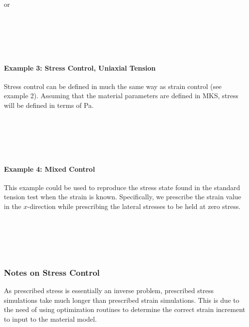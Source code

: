 \documentclass[11pt]{article}
\newcommand{\levelo}{\indent\hspace{.2in}}
\newcommand{\levelt}{\indent\hspace{.4in}}
\begin{document}
\noindent or

\indent\hspace{0.2in}\\
\indent\hspace{0.4in}\\
\indent\hspace{0.4in}\\
\indent\hspace{0.2in}\\

\paragraph{Example 3: Stress Control, Uniaxial Tension}
Stress control can be defined in much the same way as strain control (see example
2). Assuming that the material parameters are defined in MKS, stress will be
defined in terms of Pa.

\levelo{}\\
\levelt{}\\
\levelt{}\\
\levelo{}\\

\paragraph{Example 4: Mixed Control}
This example could be used to reproduce the stress state found in the standard
tension test when the strain is known. Specifically, we prescribe the strain
value in the $x$-direction while prescribing the lateral stresses to be held at
zero stress.

\levelo{}\\
\levelt{}\\
\levelt{}\\
\levelo{}\\


\subsubsection{Notes on Stress Control}
As prescribed stress is essentially an inverse problem, prescribed stress
simulations take much longer than prescribed strain simulations. This is due to
the need of using optimization routines to determine the correct strain increment
to input to the material model.
\end{document}

